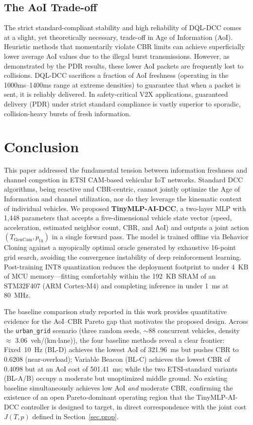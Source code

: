 \documentclass[journal]{IEEEtran}
\begin{document}
\subsection{The AoI Trade-off}
The strict standard-compliant stability and high reliability of DQL-DCC comes at a slight,
yet theoretically necessary, trade-off in Age of Information (AoI). Heuristic methods
that momentarily violate CBR limits can achieve superficially lower average AoI values
due to the illegal burst transmissions. However, as demonstrated by the PDR results,
these lower AoI packets are frequently lost to collisions. DQL-DCC sacrifices a fraction
of AoI freshness (operating in the 1000ms--1400ms range at extreme densities) to guarantee
that when a packet is sent, it is reliably delivered. In safety-critical V2X applications,
guaranteed delivery (PDR) under strict standard compliance is vastly superior to sporadic,
collision-heavy bursts of fresh information.


\section{Conclusion}
\label{sec.c}

This paper addressed the fundamental tension between information
freshness and channel congestion in ETSI CAM-based vehicular IoT
networks.  Standard DCC algorithms, being reactive and CBR-centric,
cannot jointly optimize the Age of Information and channel utilization,
nor do they leverage the kinematic context of individual vehicles.
We proposed \textbf{TinyMLP-AI-DCC}, a two-layer MLP with 1,448
parameters that accepts a five-dimensional vehicle state vector
(speed, acceleration, estimated neighbor count, CBR, and AoI) and
outputs a joint action $(T_{\text{GenCam}}, p_{\text{tx}})$ in a
single forward pass.  The model is trained offline via Behavior
Cloning against a myopically optimal oracle generated by exhaustive
16-point grid search, avoiding the convergence instability of deep
reinforcement learning.  Post-training INT8 quantization reduces the
deployment footprint to under 4~KB of MCU memory---fitting
comfortably within the 192~KB SRAM of an STM32F407 (ARM Cortex-M4)
and completing inference in under 1~ms at 80~MHz.

The baseline comparison study reported in this work provides
quantitative evidence for the AoI--CBR Pareto gap that motivates the
proposed design.  Across the \texttt{urban\_grid} scenario (three
random seeds, $\sim$88 concurrent vehicles, density $\approx$
3.06~veh/(km$\cdot$lane)), the four baseline methods reveal a clear
frontier: Fixed~10~Hz (BL-D) achieves the lowest AoI of 321.96~ms
but pushes CBR to 0.6208 (near-overload); Variable Beacon (BL-C)
achieves the lowest CBR of 0.4098 but at an AoI cost of 501.41~ms;
while the two ETSI-standard variants (BL-A/B) occupy a moderate but
unoptimized middle ground.  No existing baseline simultaneously
achieves low AoI \emph{and} moderate CBR, confirming the existence of
an open Pareto-dominant operating region that the TinyMLP-AI-DCC
controller is designed to target, in direct correspondence with the
joint cost $J(T, p)$ defined in Section~\ref{sec.prop}.
\end{document}
